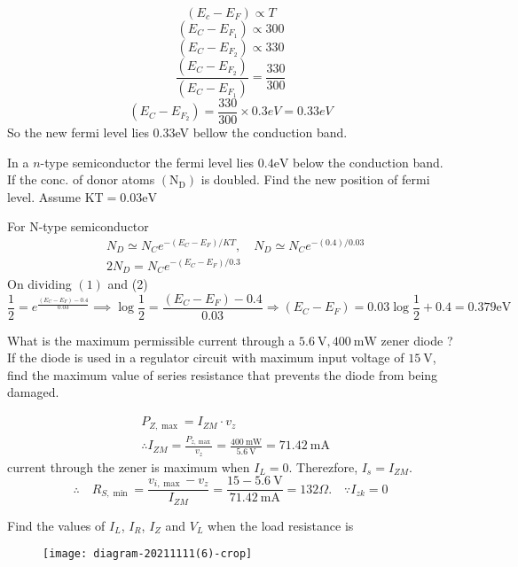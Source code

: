 \begin{enumerate}[label=\color{futuringtheme}\textbf{\arabic*.}]
\begin{answer}
		$$(E_c-E_F)\propto T$$
		$$(E_{C}-E_{F_1})\propto 300$$
		$$(E_{C}-E_{F_2})\propto 330$$
		$$\frac{(E_{C}-E_{F_2})}{(E_{C}-E_{F_1})}=\frac{330}{300}$$
		$$(E_{C}-E_{F_2})=\frac{330}{300}\times 0.3eV=0.33eV$$
		So the new fermi level lies 0.33eV bellow the conduction band.
	\end{answer}
	\begin{minipage}{\textwidth}
		\item In a $n$-type semiconductor the fermi level lies $0.4 \mathrm{eV}$ below the conduction band. If the conc. of donor atoms $\left(\mathrm{N}_{\mathrm{D}}\right)$ is doubled. Find the new position of fermi level. Assume $\mathrm{KT}=0.03 \mathrm{eV}$
	\end{minipage}
	\begin{answer}
		For N-type semiconductor
		$$
		\begin{aligned}
		&N_{D} \simeq N_{C} e^{-\left(E_{C}-E_{F}\right) / K T}, \quad N_{D} \simeq N_{C} e^{-(0.4) / 0.03} \\
		&2 N_{D}=N_{C} e^{-\left(E_{C}-E_{F}\right) / 0.3}
		\end{aligned}
		$$
		On dividing $(1)$ and (2)
		$$
		\frac{1}{2}=e^{ \frac{\left(E_{C}-E_{F}\right)-0.4}{0.03}} \implies
		\log \frac{1}{2}=\frac{\left(E_{C}-E_{F}\right)-0.4}{0.03} \Rightarrow\left(E_{C}-E_{F}\right)=0.03 \log \frac{1}{2}+0.4=0.379 \mathrm{eV}
		$$	
	\end{answer}
	\begin{minipage}{\textwidth}
		\item  What is the maximum permissible current through a $5.6 \mathrm{~V}, 400 \mathrm{~mW}$ zener diode ? If the diode is used in a regulator circuit with maximum input voltage of $15 \mathrm{~V}$, find the maximum value of series resistance that prevents the diode from being damaged.
	\end{minipage}
	\begin{answer}
		$$
		\begin{aligned}
		&P_{Z, \max }=I_{Z M} \cdot v_{z} \\
		&\therefore I_{Z M}=\frac{P_{z, \max }}{v_{z}}=\frac{400 \mathrm{~mW}}{5.6 \mathrm{~V}}=71.42 \mathrm{~mA}
		\end{aligned}
		$$
		current through the zener is maximum when $I_{L}=0$. Therezfore, $I_{s}=I_{Z M}$.
		$$
		\therefore \quad R_{S, \min }=\frac{v_{i, \max }-v_{z}}{I_{Z M}}=\frac{15-5.6 \mathrm{~V}}{71.42 \mathrm{~mA}}=132 \Omega . \quad \because I_{z k}=0
		$$	
	\end{answer}
	\begin{minipage}{\textwidth}
		\item Find the values of $I_L$, $I_R$, $I_Z$ and $V_L$ when the load resistance is \\
		\begin{figure}[H]
			\centering
			\texttt{[image: diagram-20211111(6)-crop]}
			

\end{figure}
\end{minipage}
\end{enumerate}
